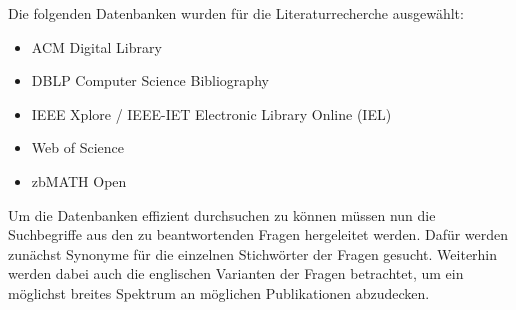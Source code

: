 Die folgenden Datenbanken wurden für die Literaturrecherche ausgewählt:

\begin{itemize}
    \item ACM Digital Library
    \item DBLP Computer Science Bibliography
    \item IEEE Xplore / IEEE-IET Electronic Library Online (IEL)
    \item Web of Science
    \item zbMATH Open
\end{itemize}

Um die Datenbanken effizient durchsuchen zu können müssen nun die Suchbegriffe aus den zu beantwortenden Fragen hergeleitet werden. Dafür werden zunächst Synonyme für die einzelnen Stichwörter der Fragen gesucht. Weiterhin werden dabei auch die englischen Varianten der Fragen betrachtet, um ein möglichst breites Spektrum an möglichen Publikationen abzudecken.

